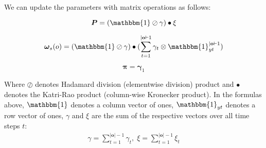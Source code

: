 We can update the parameters with matrix operations as follows:

\begin{equation}
    \boldsymbol{P} = (\mathbbm{1} \oslash \gamma) \bullet \xi
    \label{eq:transition-probabilities-update}
\end{equation}

\begin{equation}
    \boldsymbol{\omega}_s(o) = (\mathbbm{1} \oslash \gamma) \bullet (\sum_{t=1}^{|\mathbf{o}|-1} \gamma_t \otimes \mathbbm{1}_{yt}^{|\mathbf{o}|-1})
    \label{eq:omega-update}
\end{equation}

\begin{equation}
    \boldsymbol{\pi} = \boldsymbol{\gamma}_1
    \label{eq:initial-probabilities-update}
\end{equation}

Where $\oslash$ denotes Hadamard division (elementwise division) product and $\bullet$ denotes the Katri-Rao product (column-wise Kronecker product).
In the formulas above, $\mathbbm{1}$ denotes a column vector of ones, $\mathbbm{1}_{yt}$ denotes a row vector of ones, $\gamma$ and $\xi$ are the sum of the respective vectors over all time steps $t$:
\begin{align}
    \gamma = \sum_{t=1}^{|\mathbf{o}|-1} \gamma_t, \;
    \xi = \sum_{t=1}^{|\mathbf{o}|-1} \xi_t
\end{align} 

